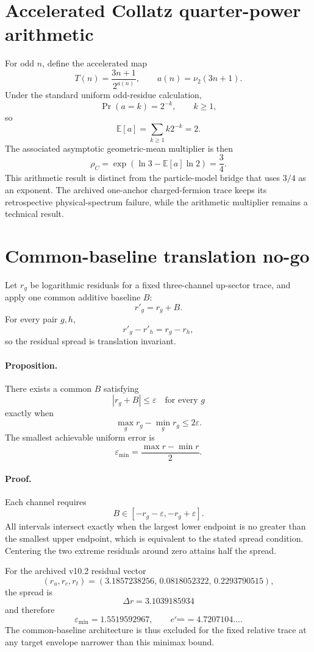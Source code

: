 \section{Accelerated Collatz quarter-power arithmetic}

For odd \(n\), define the accelerated map
\[
T(n)=\frac{3n+1}{2^{a(n)}},
\qquad
a(n)=\nu_2(3n+1).
\]
Under the standard uniform odd-residue calculation,
\[
\Pr(a=k)=2^{-k},\qquad k\ge1,
\]
so
\[
\mathbb E[a]=\sum_{k\ge1}k2^{-k}=2.
\]
The associated asymptotic geometric-mean multiplier is then
\[
\boxed{
\rho_C
=\exp\!\left(\ln3-\mathbb E[a]\ln2\right)
=\frac34.
}
\]
This arithmetic result is distinct from the particle-model bridge that uses
\(3/4\) as an exponent.  The archived one-anchor charged-fermion trace keeps its
retrospective physical-spectrum failure, while the arithmetic multiplier
remains a technical result.

\section{Common-baseline translation no-go}

Let \(r_g\) be logarithmic residuals for a fixed three-channel up-sector trace,
and apply one common additive baseline \(B\):
\[
r'_g=r_g+B.
\]
For every pair \(g,h\),
\[
r'_g-r'_h=r_g-r_h,
\]
so the residual spread is translation invariant.

\paragraph{Proposition.}
There exists a common \(B\) satisfying
\[
|r_g+B|\le\varepsilon
\quad\text{for every }g
\]
exactly when
\[
\max_g r_g-\min_g r_g\le2\varepsilon.
\]
The smallest achievable uniform error is
\[
\boxed{
\varepsilon_{\min}
=\frac{\max r-\min r}{2}.
}
\]

\paragraph{Proof.}
Each channel requires
\[
B\in[-r_g-\varepsilon,-r_g+\varepsilon].
\]
All intervals intersect exactly when the largest lower endpoint is no greater
than the smallest upper endpoint, which is equivalent to the stated spread
condition.  Centering the two extreme residuals around zero attains half the
spread.

For the archived v10.2 residual vector
\[
(r_u,r_c,r_t)
=(3.1857238256,\,0.0818052322,\,0.2293790515),
\]
the spread is
\[
\Delta r=3.1039185934
\]
and therefore
\[
\varepsilon_{\min}=1.5519592967,
\qquad
e^{\varepsilon_{\min}}=4.7207104\ldots .
\]
The common-baseline architecture is thus excluded for the fixed relative trace
at any target envelope narrower than this minimax bound.

